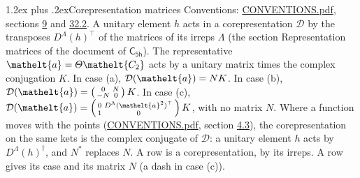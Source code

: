 \documentclass[10pt,a4paper]{article}
\makeatletter
\renewcommand\section{\@startsection{section}{1}{\z@}{-3ex plus -1ex minus -.2ex}%
  {1.2ex plus .2ex}{\normalfont\large\sffamily\bfseries\color{parttitle}}}
\numberwithin{equation}{section}
\newcommand{\eltfont}[1]{{\let\sigma\eltsigma\mathelt{#1}}}
\newcommand{\grp}[1]{\mathsf{#1}}
\newcommand{\elt}[1]{\eltfont{#1}}
\makeatother
\begin{document}
\section{Corepresentation matrices}\label{s:corep_matrices}
Conventions: \href{../../CONVENTIONS.pdf}{CONVENTIONS.pdf}, sections \href{../../../rotation/CONVENTIONS.pdf\#conv.9}{9} and \href{../../CONVENTIONS.pdf\#conv.32.2}{32.2}.
A unitary element $h$ acts in a corepresentation $\mathcal{D}$ by the transposes $D^{\Lambda}(h)^{\top}$ of the matrices of its irreps $\Lambda$ (the section Representation matrices of the document of \href{../../../rotation/data/pdf/C5h.pdf}{$\grp{C_{5h}}$}). The representative $\elt{a} = \varTheta\elt{C_{2}}$ acts by a unitary matrix times the complex conjugation $K$.
In case (a), $\mathcal{D}(\elt{a}) = NK$. In case (b), $\mathcal{D}(\elt{a}) = \left(\begin{smallmatrix} 0 & N \\ -N & 0 \end{smallmatrix}\right) K$. In case (c), $\mathcal{D}(\elt{a}) = \left(\begin{smallmatrix} 0 & D^{\Lambda}(\elt{a}^2)^{\top} \\ 1 & 0 \end{smallmatrix}\right) K$, with no matrix $N$.
Where a function moves with the points (\href{../../CONVENTIONS.pdf}{CONVENTIONS.pdf}, section \href{../../../rotation/CONVENTIONS.pdf\#conv.4.3}{4.3}), the corepresentation on the same kets is the complex conjugate of $\mathcal{D}$: a unitary element $h$ acts by $D^{\Lambda}(h)^{\dagger}$, and $N^{*}$ replaces $N$.
A row is a corepresentation, by its irreps. A row gives its case and its matrix $N$ (a dash in case (c)).
\end{document}
